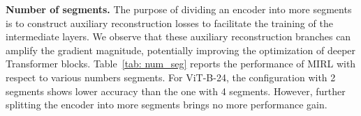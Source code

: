 \documentclass{article}
\begin{document}
\begin{table*}[!t]
\vspace{10pt}
 \hspace{4mm}
\vspace{10pt}
\end{table*}

\textbf{Number of segments.} 
The purpose of dividing an encoder into more segments is to construct auxiliary reconstruction losses to facilitate the training of the intermediate layers. 
We observe that these auxiliary reconstruction branches can amplify the gradient magnitude, potentially improving the optimization of deeper Transformer blocks.
Table~\ref{tab: num_seg} reports the performance of MIRL with respect to various numbers segments. 
For ViT-B-24, the configuration with 2 segments shows lower accuracy than the one with 4 segments. 
However, further splitting the encoder into more segments brings no more performance gain. 
\end{document}
